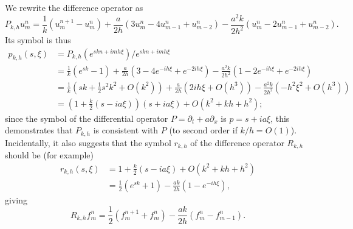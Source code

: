 \documentclass{article}
\begin{document}
\begin{itemize}
We rewrite the difference operator as
\begin{equation*}
P_{k,h} u^n_m = \frac{1}{k} \left( u^{n+1}_m - u^n_m \right) + \frac{a}{2h} \left( 3 u^n_m - 4 u^n_{m-1} + u^n_{m-2} \right) - \frac{a^2k}{2h^2} \left( u^n_m - 2 u^n_{m-1} + u^n_{m-2} \right).
\end{equation*}
Its symbol is thus
\begin{align*}
p_{k,h}(s,\xi) & = P_{k,h} \left( e^{skn + imh\xi} \right) / e^{skn + imh\xi} \\
               & = \frac{1}{k} \left( e^{sk} - 1 \right) + \frac{a}{2h} \left( 3 - 4 e^{-ih\xi} + e^{-2ih\xi} \right) - \frac{a^2k}{2h^2} \left( 1 - 2 e^{-ih\xi} + e^{-2ih\xi} \right) \\
               & = \frac{1}{k} \left( sk + \frac{1}{2} s^2 k^2 + O \left( k^2 \right) \right) + \frac{a}{2h} \left( 2ih\xi + O \left( h^3 \right) \right) - \frac{a^2k}{2h^2} \left( -h^2 \xi^2 + O \left( h^3 \right) \right) \\
               & = \left( 1 + \frac{k}{2} \left( s - ia\xi \right) \right) \left( s + ia\xi \right) + O \left( k^2 + kh + h^2 \right);
\end{align*}
since the symbol of the differential operator $P = \partial_t + a \partial_x$ is $p = s + ia\xi$, this demonstrates that $P_{k,h}$ is consistent with $P$ (to second order if $k/h = O(1)$). Incidentally, it also suggests that the symbol $r_{k,h}$ of the difference operator $R_{k,h}$ should be (for example)
\begin{align*}
r_{k,h}(s,\xi) & = 1 + \frac{k}{2} \left( s - ia\xi \right) + O \left( k^2 + kh + h^2 \right) \\
               & = \frac{1}{2} \left( e^{sk} + 1 \right) - \frac{ak}{2h} \left( 1 - e^{-ih\xi} \right),
\end{align*}
giving
\begin{equation*}
R_{k,h} f^n_m = \frac{1}{2} \left( f^{n+1}_m + f^n_m \right) - \frac{ak}{2h} \left( f^n_m - f^n_{m-1} \right).
\end{equation*}


\end{itemize}
\end{document}
